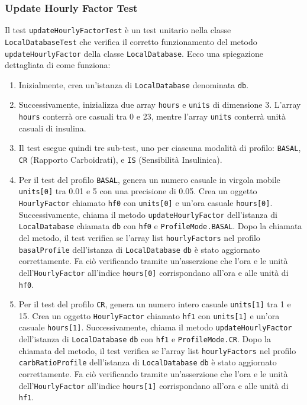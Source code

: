 \documentclass[twocolumn]{article}
\begin{document}
\subsubsection{Update Hourly Factor Test}
Il test \texttt{updateHourlyFactorTest} è un test unitario nella classe \texttt{LocalDatabaseTest} che verifica il corretto funzionamento del metodo \texttt{updateHourlyFactor} della classe \texttt{LocalDatabase}. Ecco una spiegazione dettagliata di come funziona:
\begin{enumerate}
    \item Inizialmente, crea un'istanza di \texttt{LocalDatabase} denominata \texttt{db}.
    \item Successivamente, inizializza due array \texttt{hours} e \texttt{units} di dimensione 3. L'array \texttt{hours} conterrà ore casuali tra 0 e 23, mentre l'array \texttt{units} conterrà unità casuali di insulina.
    \item Il test esegue quindi tre sub-test, uno per ciascuna modalità di profilo: \texttt{BASAL}, \texttt{CR} (Rapporto Carboidrati), e \texttt{IS} (Sensibilità Insulinica).
    \item Per il test del profilo \texttt{BASAL}, genera un numero casuale in virgola mobile \texttt{units[0]} tra 0.01 e 5 con una precisione di 0.05. Crea un oggetto \texttt{HourlyFactor} chiamato \texttt{hf0} con \texttt{units[0]} e un'ora casuale \texttt{hours[0]}. Successivamente, chiama il metodo \texttt{updateHourlyFactor} dell'istanza di \texttt{LocalDatabase} chiamata \texttt{db} con \texttt{hf0} e \texttt{ProfileMode.BASAL}. Dopo la chiamata del metodo, il test verifica se l'array list \texttt{hourlyFactors} nel profilo \texttt{basalProfile} dell'istanza di \texttt{LocalDatabase} \texttt{db} è stato aggiornato correttamente. Fa ciò verificando tramite un'asserzione che l'ora e le unità dell'\texttt{HourlyFactor} all'indice \texttt{hours[0]} corrispondano all'ora e alle unità di \texttt{hf0}.
    \item Per il test del profilo \texttt{CR}, genera un numero intero casuale \texttt{units[1]} tra 1 e 15. Crea un oggetto \texttt{HourlyFactor} chiamato \texttt{hf1} con \texttt{units[1]} e un'ora casuale \texttt{hours[1]}. Successivamente, chiama il metodo \texttt{updateHourlyFactor} dell'istanza di \texttt{LocalDatabase} \texttt{db} con \texttt{hf1} e \texttt{ProfileMode.CR}. Dopo la chiamata del metodo, il test verifica se l'array list \texttt{hourlyFactors} nel profilo \texttt{carbRatioProfile} dell'istanza di \texttt{LocalDatabase} \texttt{db} è stato aggiornato correttamente. Fa ciò verificando tramite un'asserzione che l'ora e le unità dell'\texttt{HourlyFactor} all'indice \texttt{hours[1]} corrispondano all'ora e alle unità di \texttt{hf1}.

\end{enumerate}
\end{document}
